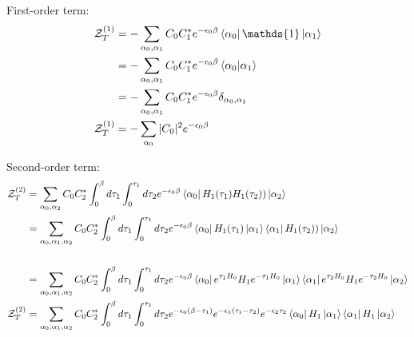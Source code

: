 \documentclass[12pt, two sided]{article}
\begin{document}
First-order term:
\begin{equation}
\begin{aligned}
\mathcal{Z}_T^{(1)} &= -\sum_{\alpha_0, \alpha_1} C_0 C_1^{*} e^{-\epsilon_0 \beta}  \bra{\alpha_0} \mathds{1} \ket{\alpha_1} \\
&= -\sum_{\alpha_0, \alpha_1} C_0 C_1^{*} e^{-\epsilon_0 \beta}  \bra{\alpha_0} \ket{\alpha_1} \\
&= -\sum_{\alpha_0, \alpha_1} C_0 C_1^{*} e^{-\epsilon_0 \beta} \delta_{\alpha_0,\alpha_1} \\
\mathcal{Z}_T^{(1)}  &= -\sum_{\alpha_0} \vert C_0 \vert^2 e^{-\epsilon_0 \beta}
\end{aligned}
\end{equation}

Second-order term:
\begin{equation}
\begin{aligned}
\mathcal{Z}_T^{(2)} &=  \sum_{\alpha_0, \alpha_2} C_0 C_2^{*} \int_0^{\beta} d\tau_1 \int_{0}^{\tau_1} d\tau_2 e^{-\epsilon_{0} \beta} \bra{\alpha_0}  H_1(\tau_1) H_1(\tau_2) ) \ket{\alpha_2} \\
&= \sum_{\alpha_0, \alpha_1, \alpha_2} C_0 C_2^{*} \int_0^{\beta} d\tau_1 \int_{0}^{\tau_1} d\tau_2 e^{-\epsilon_{0} \beta} \bra{\alpha_0}  H_1(\tau_1) \ket{\alpha_1} \bra{\alpha_1}   H_1(\tau_2) )  \ket{\alpha_2} \\
\\
&= \sum_{\alpha_0, \alpha_1, \alpha_2} C_0 C_2^{*} \int_0^{\beta} d\tau_1 \int_{0}^{\tau_1} d\tau_2 e^{-\epsilon_{0} \beta} \bra{\alpha_0}  e^{\tau_1 H_0}H_1e^{-\tau_1 H_0}  \ket{\alpha_1} \bra{\alpha_1} e^{\tau_2 H_0}H_1e^{-\tau_2 H_0}  \ket{\alpha_2} \\
\mathcal{Z}_T^{(2)} &= \sum_{\alpha_0, \alpha_1, \alpha_2} C_0 C_2^{*} \int_0^{\beta} d\tau_1 \int_{0}^{\tau_1} d\tau_2 e^{-\epsilon_0(\beta-\tau_1)} e^{-\epsilon_1(\tau_1-\tau_2)} e^{-\epsilon_2 \tau_2} \bra{\alpha_0} H_1 \ket{\alpha_1} \bra{\alpha_1} H_1 \ket{\alpha_2}
\end{aligned}
\end{equation}
\end{document}
